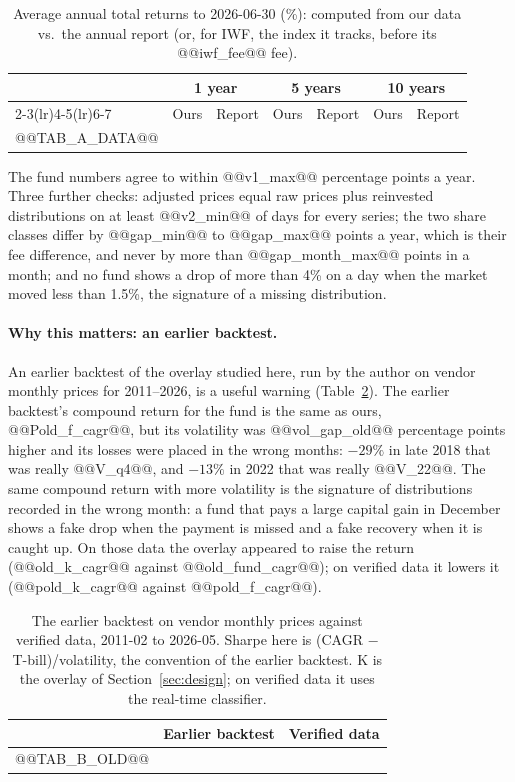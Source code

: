\documentclass[11pt,a4paper]{article}
\begin{document}
\begin{table}[htbp]
\centering
\caption{Average annual total returns to 2026-06-30 (\%): computed from our data vs.\ the annual report (or,
for IWF, the index it tracks, before its @@iwf_fee@@ fee).}
\label{tab:data}
\small
\begin{tabular}{@{}lrrrrrr@{}}
\toprule
& \multicolumn{2}{c}{1 year} & \multicolumn{2}{c}{5 years} & \multicolumn{2}{c}{10 years} \\
\cmidrule(lr){2-3}\cmidrule(lr){4-5}\cmidrule(lr){6-7}
& Ours & Report & Ours & Report & Ours & Report \\
\midrule
@@TAB_A_DATA@@
\bottomrule
\end{tabular}
\end{table}

The fund numbers agree to within @@v1_max@@ percentage points a year. Three further checks: adjusted prices
equal raw prices plus reinvested distributions on at least @@v2_min@@ of days for every series; the two share
classes differ by @@gap_min@@ to @@gap_max@@ points a year, which is their fee difference, and never by more than
@@gap_month_max@@ points in a month; and no fund shows a drop of more than 4\% on a day when the market moved
less than 1.5\%, the signature of a missing distribution.

\paragraph{Why this matters: an earlier backtest.} An earlier backtest of the overlay studied here, run by the
author on vendor monthly prices for 2011--2026, is a useful warning (Table~\ref{tab:old}). The earlier backtest's compound return for the fund is the same as ours, @@Pold_f_cagr@@, but its volatility was @@vol_gap_old@@ percentage
points higher and its losses were placed in the wrong months: $-29\%$ in late 2018 that was really @@V_q4@@,
and $-13\%$ in 2022 that was really @@V_22@@. The same compound return with more volatility is the signature
of distributions recorded in the wrong month: a fund that pays a large capital gain in December shows a fake
drop when the payment is missed and a fake recovery when it is caught up. On those data the overlay appeared
to raise the return (@@old_k_cagr@@ against @@old_fund_cagr@@); on verified data it lowers it
(@@pold_k_cagr@@ against @@pold_f_cagr@@).

\begin{table}[htbp]
\centering
\caption{The earlier backtest on vendor monthly prices against verified data, 2011-02 to 2026-05. Sharpe
here is (CAGR $-$ T-bill)/volatility, the convention of the earlier backtest. K is the overlay of
Section~\ref{sec:design}; on verified data it uses the real-time classifier.}
\label{tab:old}
\small
\begin{tabular}{@{}lrr@{}}
\toprule
& Earlier backtest & Verified data \\
\midrule
@@TAB_B_OLD@@
\bottomrule
\end{tabular}
\end{table}
\end{document}
